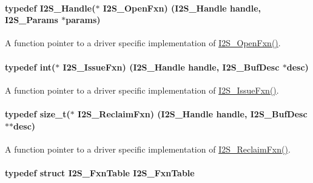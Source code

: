\paragraph[{I2\+S\+\_\+\+Open\+Fxn}]{\setlength{\rightskip}{0pt plus 5cm}typedef {\bf I2\+S\+\_\+\+Handle}($\ast$ I2\+S\+\_\+\+Open\+Fxn) ({\bf I2\+S\+\_\+\+Handle} handle, {\bf I2\+S\+\_\+\+Params} $\ast$params)}\label{_i2_s_8h_a0a8c4787b4a5a262dc86d9dfa7da2840}


A function pointer to a driver specific implementation of \hyperlink{_i2_s_8h_a0a8c4787b4a5a262dc86d9dfa7da2840}{I2\+S\+\_\+\+Open\+Fxn()}. 

\paragraph[{I2\+S\+\_\+\+Issue\+Fxn}]{\setlength{\rightskip}{0pt plus 5cm}typedef int($\ast$ I2\+S\+\_\+\+Issue\+Fxn) ({\bf I2\+S\+\_\+\+Handle} handle, {\bf I2\+S\+\_\+\+Buf\+Desc} $\ast$desc)}\label{_i2_s_8h_a29e133c66e4e69905690c63157ca662d}


A function pointer to a driver specific implementation of \hyperlink{_i2_s_8h_a29e133c66e4e69905690c63157ca662d}{I2\+S\+\_\+\+Issue\+Fxn()}. 

\paragraph[{I2\+S\+\_\+\+Reclaim\+Fxn}]{\setlength{\rightskip}{0pt plus 5cm}typedef size\+\_\+t($\ast$ I2\+S\+\_\+\+Reclaim\+Fxn) ({\bf I2\+S\+\_\+\+Handle} handle, {\bf I2\+S\+\_\+\+Buf\+Desc} $\ast$$\ast$desc)}\label{_i2_s_8h_aeb85638443d9071ae1e46233cb7ed82c}


A function pointer to a driver specific implementation of \hyperlink{_i2_s_8h_aeb85638443d9071ae1e46233cb7ed82c}{I2\+S\+\_\+\+Reclaim\+Fxn()}. 

\paragraph[{I2\+S\+\_\+\+Fxn\+Table}]{\setlength{\rightskip}{0pt plus 5cm}typedef struct {\bf I2\+S\+\_\+\+Fxn\+Table}  {\bf I2\+S\+\_\+\+Fxn\+Table}}\label{_i2_s_8h_aea46bf5e1dc3bfd520ba7d2911b15b8c}


